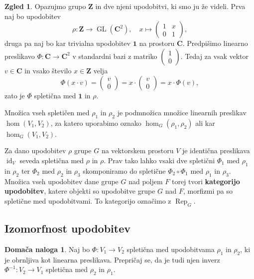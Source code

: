 \documentclass[11pt]{book}
\def\ZZ{\mathbf{Z}}
\def\CC{\mathbf{C}}
\def\oneone{\mathbf{1}}
\DeclareMathOperator\Rep{Rep}
\DeclareMathOperator\GL{GL}
\DeclareMathOperator\id{id}
\def\definicija{\color{rdeca}\bf}
\theoremstyle{definition}
\theoremstyle{zgled}
\newtheorem{zgled}[theorem]{Zgled}
\theoremstyle{zgledbrezstevilke}
\theoremstyle{odprtproblem}
\theoremstyle{domacanaloga}
\newtheorem{domacanaloga}[theorem]{Domača naloga}
\theoremstyle{izrek}
\begin{document}
\begin{zgled}
Opazujmo grupo $\ZZ$ in dve njeni upodobitvi, ki smo ju že videli. Prva naj bo upodobitev
\[
    \rho \colon \ZZ \to \GL(\CC^2), \quad
    x \mapsto \begin{pmatrix} 1 & x \\ 0 & 1 \end{pmatrix},
\]
druga pa naj bo kar trivialna upodobitev $\oneone$ na prostoru $\CC$. Predpišimo linearno preslikavo $\Phi \colon \CC \to \CC^2$ v standardni bazi z matriko $\left( \begin{smallmatrix} 1 \\ 0 \end{smallmatrix} \right)$. Tedaj za vsak vektor $v \in \CC$ in vsako število $x \in \ZZ$ velja
\[
    \Phi(x \cdot v) 
    =  \begin{pmatrix} v \\ 0 \end{pmatrix} 
    = x \cdot  \begin{pmatrix} v \\ 0 \end{pmatrix} 
    = x \cdot \Phi(v),
\]
zato je $\Phi$ spletična med $\oneone$ in $\rho$.
\end{zgled}

Množica vseh spletičen med $\rho_1$ in $\rho_2$ je podmnožica množice linearnih preslikav $\hom(V_1, V_2)$, za katero uporabimo oznako $\hom_G(\rho_1, \rho_2)$ ali kar $\hom_G(V_1, V_2)$.

Za dano upodobitev $\rho$ grupe $G$ na vektorskem prostoru $V$ je identična preslikava $\id_V$ seveda spletična med $\rho$ in $\rho$. Prav tako lahko vsaki dve spletični $\Phi_1$ med $\rho_1$ in $\rho_2$ ter $\Phi_2$ med $\rho_2$ in $\rho_3$ skomponiramo do spletične $\Phi_2 \circ \Phi_1$ med $\rho_1$ in $\rho_3$. Množica vseh upodobitev dane grupe $G$ nad poljem $F$ torej tvori {\definicija kategorijo upodobitev}, katere objekti so upodobitve grupe $G$ nad $F$, morfizmi pa so spletične med upodobitvami. To kategorijo označimo z $\Rep_G$.

\subsection{Izomorfnost upodobitev}

\begin{domacanaloga}
    Naj bo $\Phi \colon V_1 \to V_2$ spletična med upodobitvama $\rho_1$ in $\rho_2$, ki je obrnljiva kot linearna preslikava. Prepričaj se, da je tudi njen inverz $\Phi^{-1} \colon V_2 \to V_1$ spletična med $\rho_2$ in $\rho_1$.
\end{domacanaloga}
\end{document}
